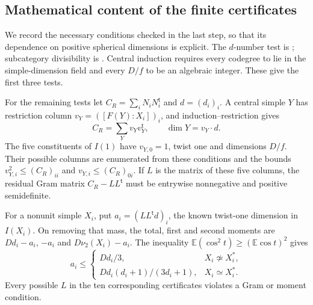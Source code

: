 \documentclass[11pt,a4paper]{article}
\numberwithin{equation}{section}
\begin{document}
\subsection{Mathematical content of the finite certificates}
We record the necessary conditions checked in the last step, so that
its dependence on positive spherical dimensions is explicit.
The $d$-number test is \cite[Theorem~1.2 and Lemma~2.7]{OstrikCodegrees}; subcategory divisibility
is \cite[Proposition~8.15]{ENO}. Central induction requires every
codegree to lie in the simple-dimension field and every $D/f$ to be
an algebraic integer. These give the first three tests.

For the remaining tests let $C_R=\sum_i N_iN_i^{\mathsf t}$ and
$d=(d_i)_i$. A central simple $Y$ has restriction column
$v_Y=([F(Y):X_i])_i$, and induction--restriction
\cite[Proposition~5.4]{ENO} gives
\[
 C_R=\sum_Y v_Yv_Y^{\mathsf t},\qquad \dim Y=v_Y\cdot d.
\]
The five constituents of $I(1)$ have $v_{Y,0}=1$, twist one and
dimensions $D/f$. Their possible columns are enumerated from these
conditions and the bounds $v_{Y,i}^2\le(C_R)_{ii}$ and
$v_{Y,i}\le(C_R)_{0i}$. If $L$ is the matrix of these five columns,
the residual Gram matrix $C_R-LL^{\mathsf t}$ must be entrywise
nonnegative and positive semidefinite.

For a nonunit simple $X_i$, put $a_i=(LL^{\mathsf t}d)_i$, the
known twist-one dimension in $I(X_i)$. On removing that mass, the total, first and second moments
are $Dd_i-a_i$, $-a_i$ and $D\nu_2(X_i)-a_i$.
The inequality $\mathbb E(\cos^2 t)\ge(\mathbb E\cos t)^2$ gives
\[
 a_i\le
 \begin{cases}
 Dd_i/3,&X_i\not\simeq X_i^*,\\
 Dd_i(d_i+1)/(3d_i+1),&X_i\simeq X_i^*.
 \end{cases}
\]
Every possible $L$ in the ten corresponding certificates violates a
Gram or moment condition.
\end{document}
